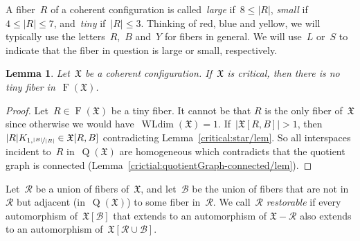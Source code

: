 \documentclass[english,a4paper]{article}
\theoremstyle{plain}
\newtheorem{lemma}      [theorem]{Lemma}
\theoremstyle{definition}
\newcommand{\abs}[1]{| #1 |}
\DeclareMathOperator{\Fibers}{F}
\newcommand{\coherentConfig}{\ensuremath{\mathfrak{X}}}
\newcommand{\fibers}[1]{\ensuremath{\Fibers \left( #1 \right)}}
\newcommand{\interspace}[2]{\ensuremath{\coherentConfig[#1,#2]}}
\DeclareMathOperator*{\WLdim}{WLdim}
\newcommand{\wldim}[1]{\ensuremath{\WLdim\left(#1\right)}}
\DeclareMathOperator*{\Quotient}{Q}
\newcommand{\quotientGraph}[1]{\ensuremath{\Quotient(#1)}}
\newcommand{\clique}[1]{\ensuremath{K_{#1}}}
\newcommand{\disjointCliques}[2]{\ensuremath{#1 \clique{#2}}}
\begin{document}
A fiber~$R$ of a coherent configuration is called~\emph{large} if~$8 \leq \abs{R}$, \emph{small} if~$4 \leq \abs{R} \leq 7$, and~\emph{tiny} if~$\abs{R} \leq 3$.
Thinking of red, blue and yellow, we will typically use the letters~$R$,~$B$ and~$Y$ for fibers in general. We will use~$L$ or~$S$ to indicate that the fiber in question is large or small, respectively.


\begin{lemma}
\label{critical:tiny-CC/lem}
    Let~$\coherentConfig$ be a coherent configuration.
    If~$\coherentConfig$ is critical, then there is no tiny fiber in~$\fibers{\coherentConfig}$.
\end{lemma}
\begin{proof}
    Let~$R \in \fibers{\coherentConfig}$ be a tiny fiber. It cannot be that $R$ is the only fiber of~$\coherentConfig$ since otherwise we would have~$ \wldim{\coherentConfig}=1$.
    If~$\abs{\interspace{R}{B}} > 1$, then~$\disjointCliques{\abs{R}}{1,\nicefrac{\abs{B}}{\abs{R}}} \in \interspace{R}{B}$ contradicting Lemma~\ref{critical:star/lem}.
    So all interspaces incident to~$R$ in~$\quotientGraph{\coherentConfig}$ are homogeneous which contradicts that the quotient graph is connected (Lemma~\ref{crictial:quotientGraph-connected/lem}).
\end{proof}


Let~$\mathcal{R}$ be a union of fibers of~$\coherentConfig$, and let~$\mathcal{B}$ be the union of fibers that are not in~$\mathcal{R}$ but adjacent (in~$\quotientGraph{\coherentConfig}$) to some fiber in~$\mathcal{R}$.
We call~$\mathcal{R}$ \emph{restorable} if every automorphism of~$\coherentConfig[\mathcal{B}]$ that extends to an automorphism of
$\coherentConfig-\mathcal{R}$ also extends to an automorphism of~$\coherentConfig[\mathcal{R} \cup \mathcal{B}]$.
\end{document}
